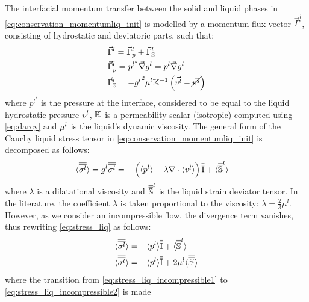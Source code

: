 The interfacial momentum transfer between the solid and liquid phases in \cref{eq:conservation_momentumliq_init} is modelled 
by a momentum flux vector $\vec{\Gamma}^{l}$, consisting of hydrostatic and deviatoric parts, such that:
\begin{align}
	\label{eq:interfacial_momentum_total}
	& \vec{\Gamma}^{l} =  \vec{\Gamma}_{p}^{l} + \vec{\Gamma}_{\mathbb{S}}^{l}	\\
	\label{eq:interfacial_momentum_hydrostatic}
	& \vec{\Gamma}_{p}^{l} = p^{l^{*}} \vec{\nabla} g^{l} = p^{l} \vec{\nabla} g^{l}		\\
	\label{eq:interfacial_momentum_deviatoric}
	& \vec{\Gamma}_{\mathbb{S}}^{l} = - {g^l}^2 \mu^l \mathbb{K}^{-1} \left(  \vec{v^l} - \cancel{\vec{v^s}}  \right)  
\end{align}
where $p^{l^{*}}$ is the pressure at the interface, considered to be equal to the liquid hydrostatic 
pressure ${p^l}$, $\mathbb{K}$ is a permeability scalar (isotropic) computed using \cref{eq:darcy} and $\mu^l$ is the liquid's 
dynamic viscosity. The general form of the Cauchy liquid stress tensor in \cref{eq:conservation_momentumliq_init} 
is decomposed as follows: 
\begin{align}
\label{eq:stress_liq}
& \langle {\overline{\overline{\sigma^l}}} \rangle = {g^l} {\overline{\overline{\sigma^l}}} = - \left( \langle {p^l} \rangle -\lambda \nabla \cdot \langle \vec{v^l} \rangle \right) {\overline{\overline{\mathrm{I}}}} + \langle {\overline{\overline{\mathbb{S}}}}^{l} \rangle
\end{align}
where $\lambda$ is a dilatational viscosity \citep{dantzig_solidification_2009} and ${\overline{\overline{\mathbb{S}}}}^{l}$ is the
liquid strain deviator tensor. In the literature, the coefficient $\lambda$ is taken proportional to the 
viscosity: $\lambda = \frac{2}{3} \mu^l $. However, as we consider an incompressible flow, the divergence 
term vanishes, thus rewriting \cref{eq:stress_liq} as follows:
\begin{subequations} 
\begin{align}
\label{eq:stress_liq_incompressible1}
& \langle {\overline{\overline{\sigma^l}}} \rangle = - \langle {p^l} \rangle {\overline{\overline{\mathrm{I}}}} + \langle {\overline{\overline{\mathbb{S}}}}^{l} \rangle \\
\label{eq:stress_liq_incompressible2}
& \langle {\overline{\overline{\sigma^l}}} \rangle = - \langle {p^l} \rangle {\overline{\overline{\mathrm{I}}}} + 2 \mu^l \langle {\overline{\overline{\dot{\varepsilon}^l}}} \rangle 
\end{align}
\end{subequations}
where the transition from \cref{eq:stress_liq_incompressible1} to \cref{eq:stress_liq_incompressible2} is made
